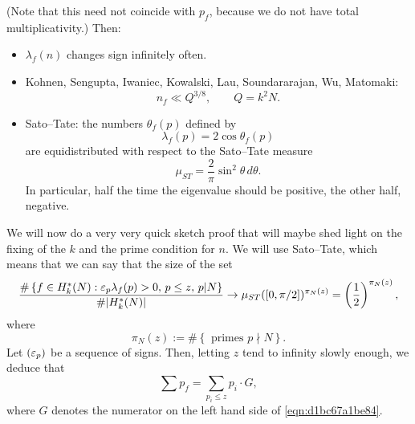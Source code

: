 \documentclass[reqno]{amsart} 
\begin{document}
(Note that this need not coincide with $p_f$, because we do not have total multiplicativity.)  Then:
\begin{itemize}
\item $\lambda_f (n)$ changes sign infinitely often.
\item Kohnen, Sengupta, Iwaniec, Kowalski, Lau, Soundararajan, Wu, Matomaki:
  \begin{equation*}
    n_f \ll Q^{3 / 8},
    \qquad Q = k^2 N.
  \end{equation*}  
\item Sato--Tate: the numbers $\theta_f (p)$ defined by
  \begin{equation*}
    \lambda_f (p) = 2 \cos \theta_f (p)
  \end{equation*}
  are equidistributed with respect to the Sato--Tate measure
  \begin{equation*}
    \mu_{S T } = \frac{2 }{ \pi } \sin^2 \theta \, d \theta.
  \end{equation*}
  In particular, half the time the eigenvalue should be positive, the other half, negative.
\end{itemize}

We will now do a very very quick sketch proof that will maybe shed light on the fixing of the $k$ and the prime condition for $n$.  We will use Sato--Tate, which means that we can say that the size of the set
\begin{equation}\label{eqn:d1bc67a1be84}
  \frac{
    \# \left\{ f \in H_k^\ast (N) :
      \varepsilon_p \lambda_f (p) > 0, \, p \leq z , \, p | N 
    \right\}
  }{
    \# \lvert H_k^\ast (N)  \rvert
  }
  \rightarrow \mu_{S T} ([0, \pi / 2])^{\pi_N(z) }
  =
  \left( \frac{1}{2} \right)^{\pi_N (z) },
\end{equation}
where
\begin{equation*}
  \pi_N (z) := \# \left\{ \text{ primes } p \nmid N \right\}.
\end{equation*}
Let $(\varepsilon_p)$ be a sequence of signs.  Then, letting $z$ tend to infinity slowly enough, we deduce that
\begin{equation*}
  \sum p_f = \sum_{p_i \leq z } p_i \cdot G,
\end{equation*}
where $G$ denotes the numerator on the left hand side of \eqref{eqn:d1bc67a1be84}.
\end{document}
